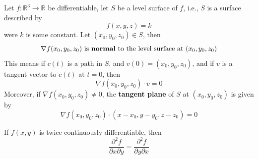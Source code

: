 \documentclass[openany]{book}
\newcommand{\R}{\mathbb{R}}
\begin{document}
\begin{prop}\label{tangent plane}
    Let $f:\R^3\to\R$ be differentiable, let $S$ be a level surface of $f$, i.e., $S$ is a surface described by 
    \begin{equation*}
        f(x,y,z)=k
    \end{equation*}
    were $k$ is some constant. Let $(x_0,y_0,z_0)\in S$, then
    \begin{equation*}
        \nabla f(x_0,y_0,z_0) \text{ is \textbf{normal} to the level surface at } (x_0,y_0,z_0)
    \end{equation*}
    This means if $c(t)$ is a path in $S$, and $v(0)=(x_0,y_0,z_0)$, and if $v$ is a tangent vector to $c(t)$ at $t=0$, then 
    \begin{equation*}
        \nabla f(x_0,y_0, z_0)\cdot v=0
    \end{equation*}
    Moreover, if $\nabla f(x_0,y_0,z_0)\neq 0$, the \textbf{tangent plane} of $S$ at $(x_0,y_0,z_0)$ is given by 
    \begin{equation*}
        \nabla f(x_0,y_0,z_0)\cdot (x-x_0, y-y_0, z-z_0)=0
    \end{equation*}
\end{prop}

\begin{prop}
    If $f(x,y)$ is twice continuously differentiable, then 
    \begin{equation*}
        \frac{\partial^2 f}{\partial x\partial y}=\frac{\partial^2f}{\partial y\partial x}
    \end{equation*}
\end{prop}




\end{document}
